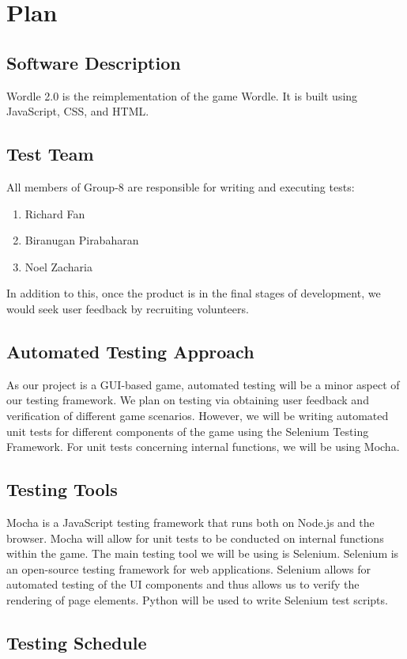 \documentclass[12pt, titlepage]{article}
\begin{document}
\section{Plan}
	
\subsection{Software Description}
Wordle 2.0 is the reimplementation of the game Wordle. It is built using 
JavaScript, CSS, and HTML.
\subsection{Test Team}
All members of Group-8 are responsible for writing and executing tests:
\begin{enumerate}
    \item Richard Fan
    \item Biranugan Pirabaharan
    \item Noel Zacharia
\end{enumerate}
In addition to this, once the product is in the final stages of development, we would seek user feedback by recruiting volunteers.

\subsection{Automated Testing Approach}
As our project is a GUI-based game, automated testing will be a minor aspect of 
our testing framework. We plan on testing via obtaining user feedback and 
verification of different game scenarios. However, we will be writing automated 
unit tests for different components of the game using the Selenium Testing 
Framework. For unit tests concerning internal functions, we will be using Mocha.
\subsection{Testing Tools}
Mocha is a JavaScript testing framework that runs both on Node.js and the 
browser. Mocha will allow for unit tests to be conducted on internal functions 
within the game. The main testing tool we will be using is Selenium. Selenium 
is an 
open-source testing framework for web applications. Selenium allows for 
automated testing of the UI components and thus allows us to verify the 
rendering of page elements. Python will be used to write Selenium test scripts.
\subsection{Testing Schedule}
		
\end{document}
